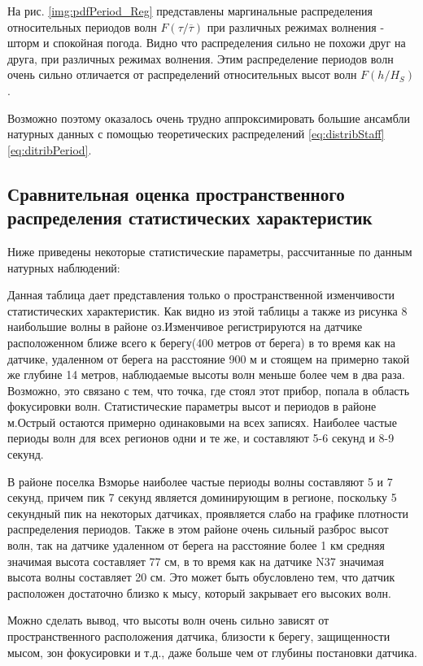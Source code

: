 На рис. \ref{img:pdfPeriod_Reg} представлены маргинальные распределения относительных периодов волн $F(\tau /\overline{\tau })$ при различных режимах волнения - шторм и спокойная погода. Видно что распределения сильно не похожи друг на друга, при различных режимах волнения.
Этим распределение периодов волн очень сильно отличается от распределений относительных высот волн $F(h/H_S)$.

Возможно поэтому оказалось очень трудно аппроксимировать большие ансамбли натурных данных с помощью теоретических распределений \eqref{eq:distribStaff} \eqref{eq:ditribPeriod}.

\subsection{Сравнительная оценка пространственного распределения статистических характеристик}

Ниже приведены некоторые статистические параметры, рассчитанные по данным натурных наблюдений:


Данная таблица дает представления только о пространственной изменчивости статистических характеристик. Как видно из этой таблицы а также из рисунка 8 наибольшие волны в районе оз.Изменчивое регистрируются на датчике расположенном ближе всего к берегу(400 метров от берега) в то время как на датчике, удаленном от берега на расстояние 900 м и стоящем на примерно такой же глубине 14 метров, наблюдаемые высоты волн меньше более чем в два раза. Возможно, это связано с тем, что точка, где стоял этот прибор, попала в область фокусировки волн. Статистические параметры высот и периодов в районе м.Острый остаются примерно одинаковыми на всех записях. Наиболее частые периоды волн для всех регионов одни и те же, и составляют 5-6 секунд и 8-9 секунд.

В районе поселка Взморье наиболее частые периоды волны составляют 5 и 7 секунд, причем пик 7 секунд является доминирующим в регионе, поскольку 5 секундный пик на некоторых датчиках, проявляется слабо на графике плотности распределения периодов. Также в этом районе очень сильный разброс высот волн, так на датчике удаленном от берега на расстояние более 1 км средняя значимая высота составляет 77 см, в то время как на датчике N37 значимая высота волны составляет 20 см. Это может быть обусловлено тем, что датчик расположен достаточно близко к мысу, который закрывает его высоких волн.

Можно сделать вывод, что высоты волн очень сильно зависят от пространственного расположения датчика, близости к берегу, защищенности мысом, зон фокусировки и т.д., даже больше чем от глубины постановки датчика.

